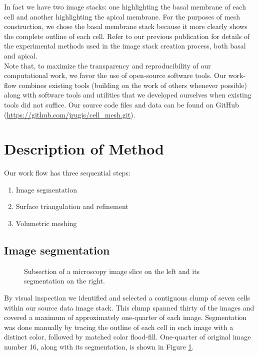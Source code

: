 \documentclass[a4paper,10pt]{article}
\begin{document}
In fact we have two image stacks: one highlighting the basal membrane of each cell and another highlighting the apical membrane. For the purposes of mesh construction, we chose the basal membrane stack because it more clearly shows the complete outline of each cell.
Refer to our previous publication \cite{Sneyd2017383} for details of the experimental methods used in the image stack creation process, both basal and apical.\\ 

Note that, to maximize the transparency and reproducibility of our computational work, we favor the use of open-source software tools. Our work-flow combines existing tools (building on the work of others whenever possible) along with software tools and utilities that we developed ourselves when existing tools did not suffice. Our source code files and data can be found on GitHub (\url{https://github.com/jrugis/cell_mesh.git}).\\

\section{Description of Method}

Our work flow has three sequential steps:
\begin{enumerate}
\item Image segmentation
\item Surface triangulation and refinement
\item Volumetric meshing
\end{enumerate}

\subsection{Image segmentation}

\begin{figure}[H]
\begin{center}
\hspace{0.5cm}
\end{center}
\caption{Subsection of a microscopy image slice on the left and its segmentation on the right.}
\label{fig:slice}
\end{figure}

By visual inspection we identified and selected a contiguous clump of seven cells within our source data image stack.  This clump spanned thirty of the images and covered a maximum of approximately one-quarter of each image. Segmentation was done manually by tracing the outline of each cell in each image with a distinct color, followed by matched color flood-fill. One-quarter of original image number 16, along with its segmentation, is shown in Figure \ref{fig:slice}.\\
\end{document}

